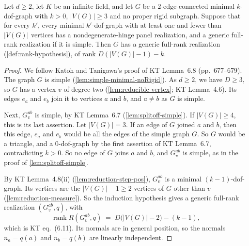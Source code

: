 \begin{lemma}
  \label{lem:case-II-realization}
  \leanok
  Let $d \ge 2$, let $K$ be an infinite field, and let $G$ be a
  $2$-edge-connected minimal $k$-dof-graph with $k > 0$, $|V(G)| \ge 3$
  and no proper rigid subgraph. Suppose that for every $k'$, every
  minimal $k'$-dof-graph with at least one and fewer than $|V(G)|$
  vertices has a nondegenerate-hinge panel realization, and a generic
  full-rank realization if it is simple. Then $G$ has a generic
  full-rank realization (\cref{def:rank-hypothesis}), of rank
  $D(|V(G)| - 1) - k$.
\end{lemma}
\begin{proof}
  \leanok
  We follow Katoh and Tanigawa's proof of KT Lemma~6.8
  (pp.~677--679). The graph $G$ is simple
  (\cref{lem:simple-minimal-noRigid}). As $d \ge 2$, we have $D \ge 3$,
  so $G$ has a vertex $v$ of degree two (\cref{lem:reducible-vertex};
  KT Lemma~4.6). Its edges $e_a$ and $e_b$ join it to vertices $a$ and
  $b$, and $a \neq b$ as $G$ is simple.

  Next, $G_v^{ab}$ is simple, by KT Lemma~6.7
  (\cref{lem:splitoff-simple}). If $|V(G)| \ge 4$, this is its last
  assertion. Let $|V(G)| = 3$. If an edge of $G$ joined $a$ and $b$, then
  this edge, $e_a$ and $e_b$ would be all the edges of the simple graph
  $G$. So $G$ would be a triangle, and a $0$-dof-graph by the first
  assertion of KT Lemma~6.7, contradicting $k > 0$. So no edge of $G$ joins $a$ and $b$, and $G_v^{ab}$ is simple,
  as in the proof of \cref{lem:splitoff-simple}.

  By KT Lemma~4.8(ii) (\cref{lem:reduction-step-pos}), $G_v^{ab}$ is a
  minimal $(k-1)$-dof-graph. Its vertices are the $|V(G)| - 1 \ge 2$
  vertices of $G$ other than $v$ (\cref{lem:reduction-measure}). So the
  induction hypothesis gives a generic full-rank realization
  $(G_v^{ab}, q)$, with
  \[
    \operatorname{rank} R(G_v^{ab}, q) \;=\;
      D\bigl(|V(G)| - 2\bigr) - (k - 1),
  \]
  which is KT eq.~(6.11). Its normals are in general position, so the
  normals $n_a = q(a)$ and $n_b = q(b)$ are linearly independent.


\end{proof}

